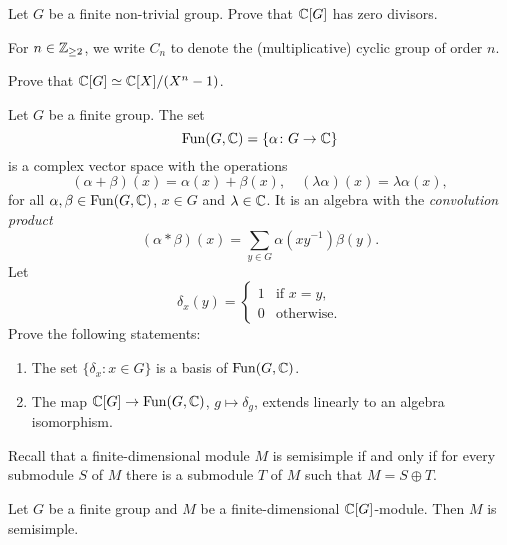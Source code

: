 \begin{exercise}
    Let $G$ be a finite non-trivial group. Prove that
    $\mathbb{C}[G]$ has zero divisors. 
\end{exercise}

For $n\in\mathbb{Z}_{\geq2}$, we write $C_n$ to denote the (multiplicative) cyclic group of order $n$. 

\begin{exercise}
Prove that $\mathbb{C}[G]\simeq \mathbb{C}[X]/(X^n-1)$. 
\end{exercise}

\begin{exercise}
    Let $G$ be a finite group. The set
    \[
    \operatorname{Fun}(G,\mathbb{C})=\{\alpha\colon G\to\mathbb{C}\}
    \]
    is a complex vector space with 
    the operations 
    \[
    (\alpha+\beta)(x)=\alpha(x)+\beta(x),
    \quad
    (\lambda\alpha)(x)=\lambda\alpha(x),
    \]
    for all $\alpha,\beta\in\operatorname{Fun}(G,\mathbb{C})$, $x\in G$ 
    and $\lambda\in\mathbb{C}$. It is an algebra
    with the \emph{convolution product} 
    \[
    (\alpha*\beta)(x)=\sum_{y\in G}\alpha(xy^{-1})\beta(y).
    \]
    Let 
    \[
    \delta_x(y)=\begin{cases}
            1 & \text{if $x=y$},\\
            0 & \text{otherwise}.
        \end{cases}
    \]
    Prove the following statements:
    \begin{enumerate}
        \item 
        The set $\{\delta_x:x\in G\}$ is a basis
        of $\operatorname{Fun}(G,\mathbb{C})$. 
        \item The map $\mathbb{C}[G]\to\operatorname{Fun}(G,\mathbb{C})$, $g\mapsto\delta_g$, 
            extends linearly to an algebra isomorphism. 
    \end{enumerate}
\end{exercise}


Recall that a finite-dimensional module $M$ is semisimple 
if and only if for every submodule $S$ of $M$ there 
is a submodule $T$ of $M$ such that $M=S\oplus T$.    

\begin{theorem}[Maschke]
    Let $G$ be a finite
    group and $M$ be a finite-dimensional $\mathbb{C}[G]$-module.
    Then $M$ is semisimple. 
\end{theorem}

